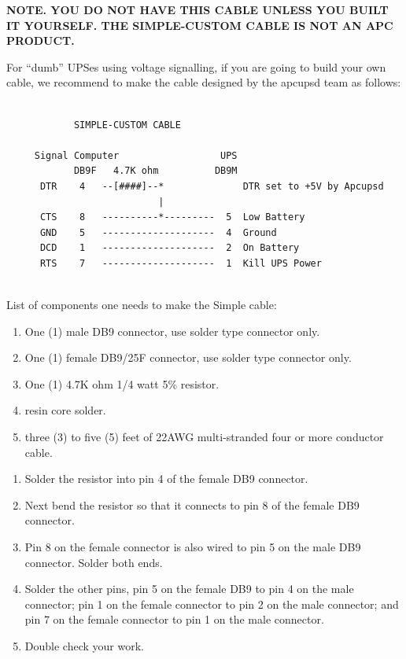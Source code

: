 \label{index-Cables_002c-dumb-196}
\label{index-dumb_002c-Cables-197}
{\bf NOTE. YOU DO NOT HAVE THIS CABLE UNLESS YOU BUILT IT YOURSELF.  THE
SIMPLE-CUSTOM CABLE IS NOT AN APC PRODUCT.}  

For ``dumb'' UPSes using voltage signalling, if you are going to build your
own cable, we recommend to make the cable designed by the apcupsd team as
follows: 

\footnotesize
\begin{verbatim}
     
            SIMPLE-CUSTOM CABLE
     
     Signal Computer                  UPS
            DB9F   4.7K ohm          DB9M
      DTR    4   --[####]--*              DTR set to +5V by Apcupsd
                           |
      CTS    8   ----------*---------  5  Low Battery
      GND    5   --------------------  4  Ground
      DCD    1   --------------------  2  On Battery
      RTS    7   --------------------  1  Kill UPS Power
     
\end{verbatim}
\normalsize

List of components one needs to make the Simple cable:  

\begin{enumerate}
\item One (1) male DB9 connector, use solder type connector only.  
\item One (1) female DB9/25F connector, use solder type connector only.  
\item One (1) 4.7K ohm 1/4 watt 5\% resistor.  
\item resin core solder.  
\item three (3) to five (5) feet of 22AWG multi-stranded four or more
conductor cable.  
\end{enumerate}

\begin{enumerate}
\item Solder the resistor into pin 4 of the female DB9 connector.  
\item Next bend the resistor so that it connects to pin 8 of the female DB9
connector.  
\item Pin 8 on the female connector is also wired to pin 5 on the male DB9
connector. Solder both ends.  
\item Solder the other pins, pin 5 on the female DB9 to pin 4 on the male
connector; pin 1 on the female connector to pin 2 on the male connector; and
pin 7 on the female connector to pin 1 on the male connector.  
\item Double check your work.  
\end{enumerate}

